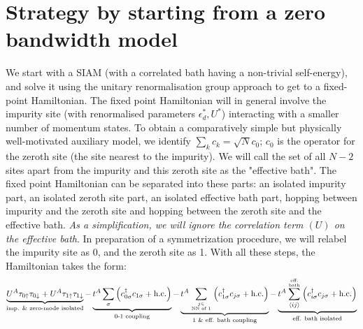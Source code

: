 \documentclass{report}
\numberwithin{equation}{section}
\begin{document}
\section{Strategy by starting from a zero bandwidth model}
We start with a SIAM (with a correlated bath having a non-trivial self-energy), and solve it using the unitary renormalisation group approach to get to a fixed-point Hamiltonian. The fixed point Hamiltonian will in general involve the impurity site (with renormalised parameters $\epsilon_d^*, U^*$) interacting with a smaller number of momentum states.
 To obtain a comparatively simple but physically well-motivated auxiliary model, we identify $\sum_k c_k = \sqrt N c_0$; \(c_0\) is the operator for the zeroth site (the site nearest to the impurity). We will call the set of all \(N-2\) sites apart from the impurity and this zeroth site as the "effective bath". The fixed point Hamiltonian can be separated into these parts: an isolated impurity part, an isolated zeroth site part, an isolated effective bath part, hopping between impurity and the zeroth site and hopping between the zeroth site and the effective bath. \textit{As a simplification, we will ignore the correlation term \((U)\) on the effective bath}. In preparation of a symmetrization procedure, we will relabel the impurity site as 0, and the zeroth site as 1. With all these steps, the Hamiltonian takes the form:
 \begin{equation}\begin{aligned}
 	\underbrace{U^A\tau_{0 \uparrow}\tau_{0 \downarrow} + U^A\tau_{1 \uparrow}\tau_{1 \downarrow}}_\text{imp. \& zero-mode isolated} - \underbrace{t^A\sum_{\sigma}\left(c^\dagger_{0\sigma}c_{1\sigma} + \text{h.c.}\right)}_\text{0-1 coupling} - \underbrace{t^A\sum_{j \in \atop{\text{NN of 1}}}\left(c^\dagger_{1\sigma}c_{j\sigma} + \text{h.c.}\right)}_\text{1 \& eff. bath coupling} - \underbrace{t^A \sum_{\left<ij \right>}^{\text{eff.} \atop{\text{bath}}}\left(c^\dagger_{i\sigma}c_{j\sigma} + \text{h.c.}\right)}_\text{eff. bath isolated}
 \end{aligned}\end{equation}
\end{document}
